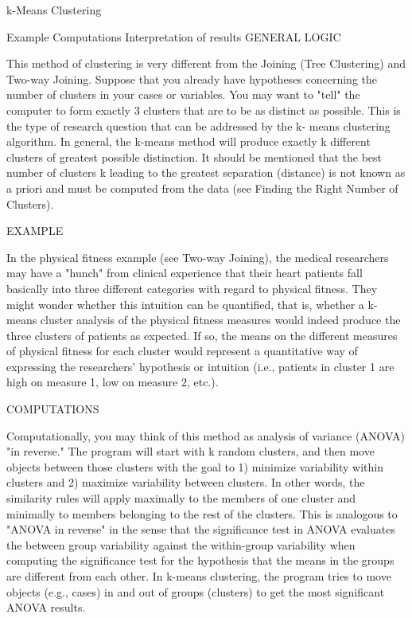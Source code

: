 
 
k-Means Clustering

Example
Computations
Interpretation of results
GENERAL LOGIC

This method of clustering is very different from the Joining (Tree Clustering) and Two-way Joining. Suppose that you already have hypotheses concerning the number of clusters in your cases or variables. You may want to "tell" the computer to form exactly 3 clusters that are to be as distinct as possible. This is the type of research question that can be addressed by the k- means clustering algorithm. In general, the k-means method will produce exactly k different clusters of greatest possible distinction. It should be mentioned that the best number of clusters k leading to the greatest separation (distance) is not known as a priori and must be computed from the data (see Finding the Right Number of Clusters).

EXAMPLE

In the physical fitness example (see Two-way Joining), the medical researchers may have a "hunch" from clinical experience that their heart patients fall basically into three different categories with regard to physical fitness. They might wonder whether this intuition can be quantified, that is, whether a k-means cluster analysis of the physical fitness measures would indeed produce the three clusters of patients as expected. If so, the means on the different measures of physical fitness for each cluster would represent a quantitative way of expressing the researchers' hypothesis or intuition (i.e., patients in cluster 1 are high on measure 1, low on measure 2, etc.).

COMPUTATIONS

Computationally, you may think of this method as analysis of variance (ANOVA) "in reverse." The program will start with k random clusters, and then move objects between those clusters with the goal to 1) minimize variability within clusters and 2) maximize variability between clusters. In other words, the similarity rules will apply maximally to the members of one cluster and minimally to members belonging to the rest of the clusters. This is analogous to "ANOVA in reverse" in the sense that the significance test in ANOVA evaluates the between group variability against the within-group variability when computing the significance test for the hypothesis that the means in the groups are different from each other. In k-means clustering, the program tries to move objects (e.g., cases) in and out of groups (clusters) to get the most significant ANOVA results.

